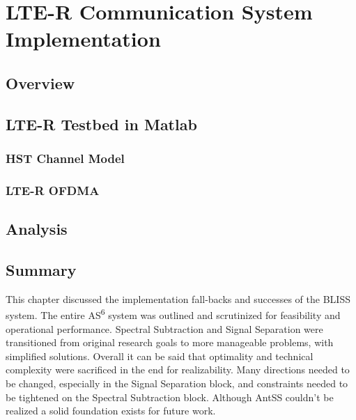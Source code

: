 \chapter{LTE-R Communication System Implementation}
\label{chapter5}

\section{Overview}

\section{LTE-R Testbed in Matlab}
\subsection{HST Channel Model}
\subsection{LTE-R OFDMA}

\section{Analysis}

\section{Summary}
This chapter discussed the implementation fall-backs and successes of the BLISS system.  The entire AS\textsuperscript{6} system was outlined and scrutinized for feasibility and operational performance.  Spectral Subtraction and Signal Separation were transitioned from original research goals to more manageable problems, with simplified solutions.  Overall it can be said that optimality and technical complexity were sacrificed in the end for realizability.  Many directions needed to be changed, especially in the Signal Separation block, and constraints needed to be tightened on the Spectral Subtraction block.  Although AntSS couldn't be realized a solid foundation exists for future work.\\ 




